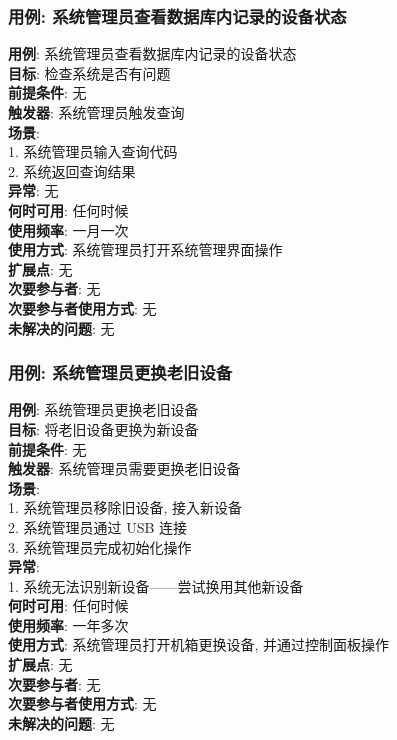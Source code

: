\documentclass[UTF8]{article}
\begin{document}
\subsubsection{用例: 系统管理员查看数据库内记录的设备状态}
\noindent
\textbf{用例}: 系统管理员查看数据库内记录的设备状态
\\
\textbf{目标}: 检查系统是否有问题
\\
\textbf{前提条件}: 无
\\
\textbf{触发器}: 系统管理员触发查询
\\
\textbf{场景}: \\
	\hspace*{2em} 1. 系统管理员输入查询代码 \\
	\hspace*{2em} 2. 系统返回查询结果 \\
\textbf{异常}: 无 \\
\textbf{何时可用}: 任何时候 \\
\textbf{使用频率}: 一月一次 \\
\textbf{使用方式}: 系统管理员打开系统管理界面操作 \\
\textbf{扩展点}: 无 \\
\textbf{次要参与者}: 无 \\
\textbf{次要参与者使用方式}: 无 \\
\textbf{未解决的问题}: 无 \\
				
\subsubsection{用例: 系统管理员更换老旧设备}
\noindent
\textbf{用例}: 系统管理员更换老旧设备
\\
\textbf{目标}: 将老旧设备更换为新设备
\\
\textbf{前提条件}: 无
\\
\textbf{触发器}: 系统管理员需要更换老旧设备
\\
\textbf{场景}: \\
	\hspace*{2em} 1. 系统管理员移除旧设备, 接入新设备 \\
	\hspace*{2em} 2. 系统管理员通过 USB 连接 \\
	\hspace*{2em} 3. 系统管理员完成初始化操作 \\
\textbf{异常}: \\
	\hspace*{2em} 1. 系统无法识别新设备——尝试换用其他新设备 \\
\textbf{何时可用}: 任何时候 \\
\textbf{使用频率}: 一年多次 \\
\textbf{使用方式}: 系统管理员打开机箱更换设备, 并通过控制面板操作 \\
\textbf{扩展点}: 无 \\
\textbf{次要参与者}: 无 \\
\textbf{次要参与者使用方式}: 无 \\
\textbf{未解决的问题}: 无 \\
				
\end{document}
